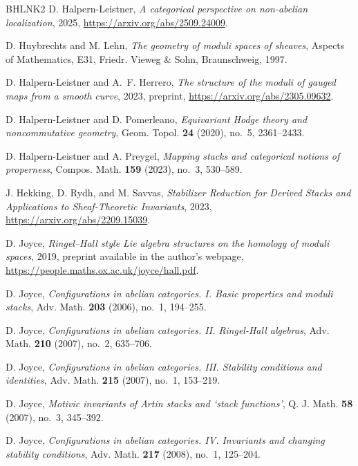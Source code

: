 \documentclass[12pt]{amsart}
\theoremstyle{definition}
\newcommand{\1}{\mathbf 1}
\begin{document}
\begin{thebibliography}{BHLNK2}
D. Halpern-Leistner, \emph{A categorical perspective on non-abelian localization}, 2025, \url{https://arxiv.org/abs/2509.24009}.

D. Huybrechts and M. Lehn, \emph{The geometry of moduli spaces of sheaves}, Aspects of Mathematics, E31, Friedr. Vieweg \& Sohn, Braunschweig, 1997.

D. Halpern-Leistner and A.~F. Herrero, \emph{The structure of the moduli of gauged maps from a smooth curve}, 2023, preprint, \url{https://arxiv.org/abs/2305.09632}.

D. Halpern-Leistner and D. Pomerleano, \emph{Equivariant {H}odge theory and noncommutative geometry}, Geom. Topol. \textbf{24} (2020), no.~5, 2361--2433.

D. Halpern-Leistner and A. Preygel, \emph{Mapping stacks and categorical notions of properness}, Compos. Math. \textbf{159} (2023), no.~3, 530--589.

J. Hekking, D. Rydh, and M. Savvas, \emph{Stabilizer Reduction for Derived Stacks and Applications to Sheaf-Theoretic Invariants}, 2023, \url{https://arxiv.org/abs/2209.15039}.

D. Joyce, \emph{Ringel–Hall style Lie algebra structures on the homology of moduli spaces}, 2019, preprint available in the author's webpage, \url{https://people.maths.ox.ac.uk/joyce/hall.pdf}.

D. Joyce, \emph{Configurations in abelian categories. {I}. {B}asic properties and moduli stacks}, Adv. Math. \textbf{203} (2006), no.~1, 194--255.

D. Joyce, \emph{Configurations in abelian categories. {II}. {R}ingel-{H}all algebras}, Adv. Math. \textbf{210} (2007), no.~2, 635--706.

D. Joyce, \emph{Configurations in abelian categories. {III}. {S}tability conditions and identities}, Adv. Math. \textbf{215} (2007), no.~1, 153--219.

D. Joyce, \emph{Motivic invariants of {A}rtin stacks and `stack functions'}, Q. J. Math. \textbf{58} (2007), no.~3, 345--392.

D. Joyce, \emph{Configurations in abelian categories. {IV}. {I}nvariants and changing stability conditions}, Adv. Math. \textbf{217} (2008), no.~1, 125--204.


\end{thebibliography}
\end{document}
